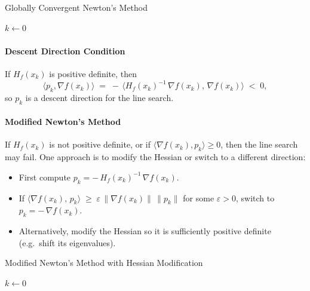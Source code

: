 \begin{algorithm}[H]
\caption{Globally Convergent Newton's Method}
\label{alg:newton-global}
$k \gets 0$\;
\;
\end{algorithm}

\paragraph{Descent Direction Condition}
If \(H_f(x_k)\) is positive definite, then
\[
    \langle p_k, \nabla f(x_k)\rangle
    \;=\;
    -\,\langle H_f(x_k)^{-1}\,\nabla f(x_k),\,\nabla f(x_k)\rangle
    \;<\; 0,
\]
so \(p_k\) is a descent direction for the line search.

\paragraph{Modified Newton's Method}
If \(H_f(x_k)\) is not positive definite, or if \(\langle \nabla f(x_k), p_k\rangle \geq 0\), then the line search may fail. One approach is to modify the Hessian or switch to a different direction:

\begin{itemize}
    \item First compute \(p_k = -\,H_f(x_k)^{-1}\,\nabla f(x_k)\).
    \item If \(\langle \nabla f(x_k),\,p_k\rangle \;\ge\; \varepsilon \,\|\nabla f(x_k)\|\,\|p_k\|\) for some \(\varepsilon > 0\), switch to \(p_k = -\,\nabla f(x_k)\).
    \item Alternatively, modify the Hessian so it is sufficiently positive definite (e.g.\ shift its eigenvalues).
\end{itemize}

\begin{algorithm}[H]
\caption{Modified Newton's Method with Hessian Modification}
\label{alg:newton-modified}
$k \gets 0$\;
\;
\end{algorithm}

